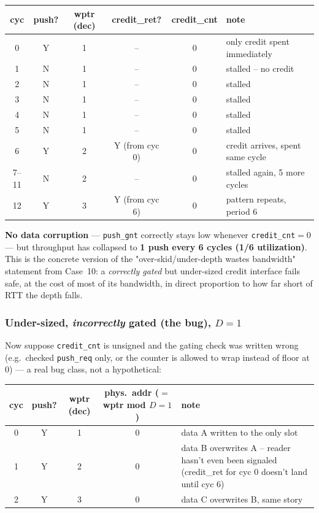 \documentclass[12pt]{article}
\begin{document}
\begin{center}\small
\renewcommand{\arraystretch}{1.05}
\begin{tabular}{cccccl}
\toprule
cyc & push? & wptr (dec) & credit\_ret? & credit\_cnt & note \\
\midrule
0 & Y & 1 & -- & 0 & only credit spent immediately \\
1 & \cellcolor{RedF}N & 1 & -- & 0 & \cellcolor{RedF}stalled -- no credit \\
2 & \cellcolor{RedF}N & 1 & -- & 0 & \cellcolor{RedF}stalled \\
3 & \cellcolor{RedF}N & 1 & -- & 0 & \cellcolor{RedF}stalled \\
4 & \cellcolor{RedF}N & 1 & -- & 0 & \cellcolor{RedF}stalled \\
5 & \cellcolor{RedF}N & 1 & -- & 0 & \cellcolor{RedF}stalled \\
6 & Y & 2 & Y (from cyc 0) & 0 & credit arrives, spent same cycle \\
7--11 & N & 2 & -- & 0 & stalled again, 5 more cycles \\
12 & Y & 3 & Y (from cyc 6) & 0 & pattern repeats, period 6 \\
\bottomrule
\end{tabular}
\end{center}

\textbf{No data corruption} — \texttt{push\_gnt} correctly stays low
whenever \texttt{credit\_cnt}$=0$ — but throughput has collapsed to
\textbf{1 push every 6 cycles (1/6 utilization)}. This is the concrete
version of the "over-skid/under-depth wastes bandwidth" statement from
Case~10: a \emph{correctly gated} but under-sized credit interface fails
safe, at the cost of most of its bandwidth, in direct proportion to how far
short of RTT the depth falls.

\subsubsection{Under-sized, \emph{incorrectly} gated (the bug), $D=1$}

Now suppose \texttt{credit\_cnt} is unsigned and the gating check was
written wrong (e.g.\ checked \texttt{push\_req} only, or the counter is
allowed to wrap instead of floor at 0) — a real bug class, not a
hypothetical:

\begin{center}\small
\renewcommand{\arraystretch}{1.05}
\begin{tabular}{ccccl}
\toprule
cyc & push? & wptr (dec) & phys.\ addr ($=$wptr mod $D{=}1$) & note \\
\midrule
0 & Y & 1 & 0 & data A written to the only slot \\
1 & Y & 2 & \cellcolor{RedF}0 & \cellcolor{RedF}data B overwrites A -- reader hasn't even been signaled (credit\_ret for cyc 0 doesn't land until cyc 6) \\
2 & Y & 3 & \cellcolor{RedF}0 & data C overwrites B, same story \\
\bottomrule
\end{tabular}
\end{center}
\end{document}
